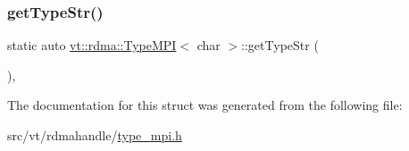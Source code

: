 \subsubsection{\texorpdfstring{get\+Type\+Str()}{getTypeStr()}}
{\footnotesize\ttfamily static auto \hyperlink{structvt_1_1rdma_1_1_type_m_p_i}{vt\+::rdma\+::\+Type\+M\+PI}$<$ char $>$\+::get\+Type\+Str (\begin{DoxyParamCaption}{ }\end{DoxyParamCaption})\hspace{0.3cm}{\ttfamily [inline]}, {\ttfamily [static]}}



The documentation for this struct was generated from the following file\+:\begin{DoxyCompactItemize}
\item 
src/vt/rdmahandle/\hyperlink{type__mpi_8h}{type\+\_\+mpi.\+h}\end{DoxyCompactItemize}
